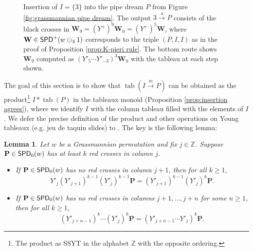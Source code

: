 \documentclass[11pt,reqno]{amsart} %
\newcommand{\bbZ}{\mathbb{Z}}
\newcommand{\bfP}{\mathbf{P}}
\newcommand{\bfW}{\mathbf{W}}
\newcommand{\msert}{\overset{m}{\rightarrow}}
\DeclareMathOperator{\SPD}{\sf{SPD}}
\DeclareMathOperator{\tab}{tab}
\newenvironment{shift}[1][(0,0)]{
    \begin{scope}[shift={#1}]
}{
    \end{scope}
}
\newtheorem{lemma}[theorem]{Lemma}
\theoremstyle{definition}
\begin{document}
\begin{figure}

\caption{
    Insertion of $I = \{3\}$ into the pipe dream $P$ from Figure \ref{fig:grassmannian pipe dream}.
    The output $3\overset4\to P$ consists of the black crosses in $\bfW_9 = (Y^+)^9\bfW_0 = (Y^+)^5\bfW$, where $\bfW\in \SPD^+(w\ominus_4 1)$ corresponds to the triple $(P,I,I)$ as in the proof of Proposition \ref{prop:K-pieri rule}.
    The bottom route shows $\bfW_9$ computed as $(Y'_5\cdots Y'_{-3})^3\bfW_0$ with the tableau at each step shown.
}
\label{fig:grassmannian insertion}
\end{figure}

The goal of this section is to show that $\tab(I\msert P)$ can be obtained as the product\footnote{
    The product as SSYT in the alphabet $\bbZ$ with the opposite ordering.
} $I*\tab(P)$ in the tableaux monoid (Proposition \ref{prop:insertion agrees}), where we identify $I$ with the column tableau filled with the elements of $I$.
We defer the precise definition of the product and other operations on Young tableaux (e.g. jeu de taquin slides) to \cite{Fulton97}.
The key is the following lemma:

\begin{lemma}
\label{lem:grassmannian insertion}
Let $w$ be a Grassmannian permutation and fix $j\in\bbZ$.
Suppose $\bfP\in \SPD_0(w)$ has at least $k$ red crosses in column $j$.

\begin{itemize}
    \item[(i)]
    If $\bfP\in \SPD_0(w)$ has no red crosses in column $j+1$, then for all $k\geq 1$, \[
        Y'_j(Y'_{j+1})^{k-1}(Y'_j)^{k-1}\bfP = (Y'_{j+1})^{k-1}(Y'_j)^k\bfP.
    \]
    
    \item[(ii)]
    If $\bfP\in \SPD_0(w)$ has no red crosses in columns $j+1,\dots,j+n$ for some $n\geq 1$, then for all $k\geq 1$, \[
        (Y'_{j+n-1})^k\cdots (Y'_j)^k\bfP
        = (Y'_{j+n-1}\cdots Y'_j)^k\bfP.
    \]
\end{itemize}
\end{lemma}
\end{document}
